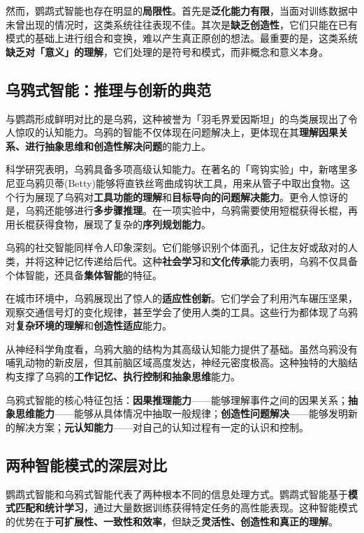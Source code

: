 然而，鹦鹉式智能也存在明显的{\bf 局限性}。首先是{\bf 泛化能力有限}，当面对训练数据中未曾出现的情况时，这类系统往往表现不佳。其次是{\bf 缺乏创造性}，它们只能在已有模式的基础上进行组合和变换，难以产生真正原创的想法。最重要的是，这类系统{\bf 缺乏对「意义」的理解}，它们处理的是符号和模式，而非概念和意义本身。

\subsection{乌鸦式智能：推理与创新的典范}

与鹦鹉形成鲜明对比的是乌鸦，这种被誉为「羽毛界爱因斯坦」的鸟类展现出了令人惊叹的认知能力。乌鸦的智能不仅体现在问题解决上，更体现在其{\bf 理解因果关系、进行抽象思维和创造性解决问题}的能力上。

科学研究表明，乌鸦具备多项高级认知能力。在著名的「弯钩实验」中，新喀里多尼亚乌鸦贝蒂(Betty)能够将直铁丝弯曲成钩状工具，用来从管子中取出食物。这个行为展现了乌鸦对{\bf 工具功能的理解}和{\bf 目标导向的问题解决能力}。更令人惊讶的是，乌鸦还能够进行{\bf 多步骤推理}。在一项实验中，乌鸦需要使用短棍获得长棍，再用长棍获得食物，展现了复杂的{\bf 序列规划能力}。

乌鸦的社交智能同样令人印象深刻。它们能够识别个体面孔，记住友好或敌对的人类，并将这种记忆传递给后代。这种{\bf 社会学习}和{\bf 文化传承}能力表明，乌鸦不仅具备个体智能，还具备{\bf 集体智能}的特征。

在城市环境中，乌鸦展现出了惊人的{\bf 适应性创新}。它们学会了利用汽车碾压坚果，观察交通信号灯的变化规律，甚至学会了使用人类的工具。这些行为都体现了乌鸦对{\bf 复杂环境的理解}和{\bf 创造性适应}能力。

从神经科学角度看，乌鸦大脑的结构为其高级认知能力提供了基础。虽然乌鸦没有哺乳动物的新皮层，但其前脑区域高度发达，神经元密度极高。这种独特的大脑结构支撑了乌鸦的{\bf 工作记忆、执行控制和抽象思维}能力。

乌鸦式智能的核心特征包括：{\bf 因果推理能力}——能够理解事件之间的因果关系；{\bf 抽象思维能力}——能够从具体情况中抽取一般规律；{\bf 创造性问题解决}——能够发明新的解决方案；{\bf 元认知能力}——对自己的认知过程有一定的认识和控制。

\subsection{两种智能模式的深层对比}

鹦鹉式智能和乌鸦式智能代表了两种根本不同的信息处理方式。鹦鹉式智能基于{\bf 模式匹配和统计学习}，通过大量数据训练获得特定任务的高性能表现。这种智能模式的优势在于{\bf 可扩展性、一致性和效率}，但缺乏{\bf 灵活性、创造性和真正的理解}。

